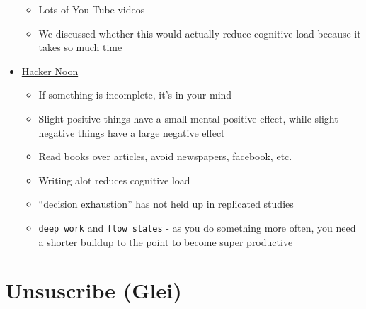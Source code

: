 \documentclass[
  letterpaper,
  DIV=11,
  numbers=noendperiod]{scrreprt}
\begin{document}
\begin{itemize}
  \begin{itemize}
  \item
    Lots of You Tube videos
  \item
    We discussed whether this would actually reduce cognitive load
    because it takes so much time
  \end{itemize}
\item
  \href{https://hackernoon.com/minimizing-the-cognitive-load-in-your-life-bc14f4309fb2}{Hacker
  Noon}

  \begin{itemize}
  \item
    If something is incomplete, it's in your mind
  \item
    Slight positive things have a small mental positive effect, while
    slight negative things have a large negative effect
  \item
    Read books over articles, avoid newspapers, facebook, etc.
  \item
    Writing alot reduces cognitive load
  \item
    ``decision exhaustion'' has not held up in replicated studies
  \item
    \texttt{deep\ work} and \texttt{flow\ states} - as you do something
    more often, you need a shorter buildup to the point to become super
    productive
  \end{itemize}
\end{itemize}

\hypertarget{unsuscribe-glei}{%
\section*{\texorpdfstring{\textbf{Unsuscribe
(Glei)}}{Unsuscribe (Glei)}}\label{unsuscribe-glei}}

\end{document}

